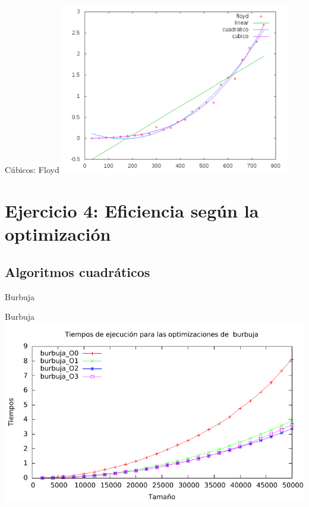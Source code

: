 \documentclass[10pt,compress,usetitleprogressbar,mathserif]{beamer}
\begin{document}
\begin{frame}{Cúbicos: Floyd}
	\includegraphics[width = 10cm ]{img/floyd_hibrida.pdf}
\end{frame}

\section{Ejercicio 4: \large{Eficiencia según la optimización }}

\subsection{Algoritmos cuadráticos}

\begin{frame}{Burbuja}
	
\end{frame}

\begin{frame}{Burbuja}
	\includegraphics[width = \textwidth ]{img/burbuja_optim_g.pdf}
\end{frame}
\end{document}
